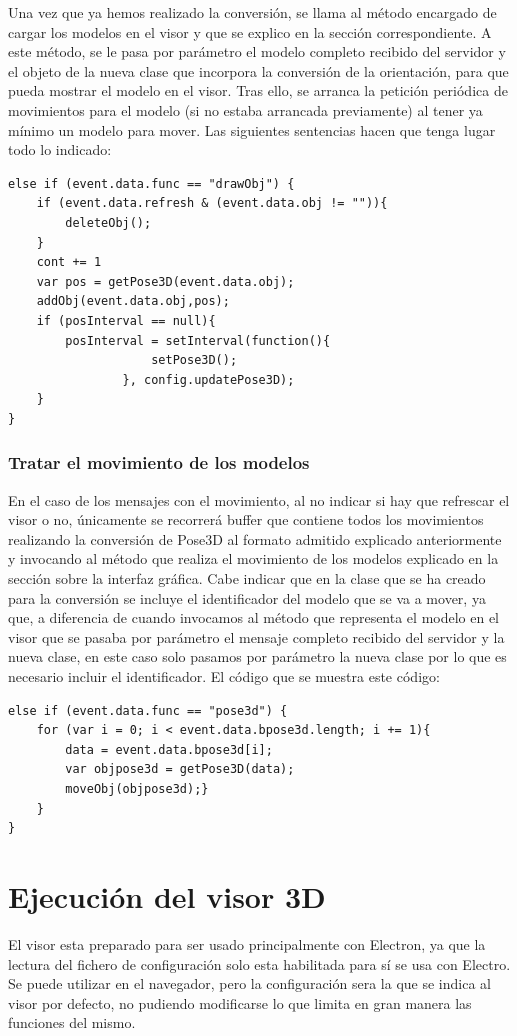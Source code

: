 Una vez que ya hemos realizado la conversión, se llama al método encargado de cargar los modelos en el visor y que se explico en la sección correspondiente. A este método, se le pasa por parámetro el modelo completo recibido del servidor y el objeto de la nueva clase que incorpora la conversión de la orientación, para que pueda mostrar el modelo en el visor. Tras ello, se arranca la petición periódica de movimientos para el modelo (si no estaba arrancada previamente) al tener ya mínimo un modelo para mover. Las siguientes sentencias hacen que tenga lugar todo lo indicado:

\begin{lstlisting}[frame=single]
else if (event.data.func == "drawObj") {
	if (event.data.refresh & (event.data.obj != "")){
		deleteObj();
	}
	cont += 1
	var pos = getPose3D(event.data.obj);
	addObj(event.data.obj,pos);
	if (posInterval == null){ 
		posInterval = setInterval(function(){
					setPose3D();
				}, config.updatePose3D);
	}
}
\end{lstlisting}

\subsubsection{Tratar el movimiento de los modelos}
En el caso de los mensajes con el movimiento, al no indicar si hay que refrescar el visor o no, únicamente se recorrerá buffer que contiene todos los movimientos realizando la conversión de Pose3D al formato admitido explicado anteriormente y invocando al método que realiza el movimiento de los modelos explicado en la sección sobre la interfaz gráfica. Cabe indicar que en la clase que se ha creado para la conversión se incluye el identificador del modelo que se va a mover, ya que, a diferencia de cuando invocamos al método que representa el modelo en el visor que se pasaba por parámetro el mensaje completo recibido del servidor y la nueva clase, en este caso solo pasamos por parámetro la nueva clase por lo que es necesario incluir el identificador. El código que se muestra este código:

\begin{lstlisting}[frame=single]
else if (event.data.func == "pose3d") {
	for (var i = 0; i < event.data.bpose3d.length; i += 1){
		data = event.data.bpose3d[i];
		var objpose3d = getPose3D(data);
		moveObj(objpose3d);}
	}
}
\end{lstlisting}

\section{Ejecución del visor 3D}
El visor esta preparado para ser usado principalmente con Electron, ya que la lectura del fichero de configuración solo esta habilitada para sí se usa con Electro. Se puede utilizar en el navegador, pero la configuración sera la que se indica al visor por defecto, no pudiendo modificarse lo que limita en gran manera las funciones del mismo.

